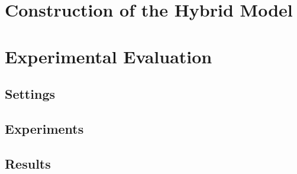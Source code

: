 \documentclass[11pt,titlepage,oneside,openany]{book}
\renewcommand{\algorithmiccomment}[1]{\ensuremath{\rhd} \textit{#1}}
\def\MYCALL#1#2{{\small\textsc{#1}}(\textup{#2})}
\def\MYNOT{\textbf{ not }}
\def\MYBREAK{\textbf{break }}
\def\MYNIL{\textsc{Nil}}
\def\ONT{{\mathcal O}} %
\def\ALI{{\mathcal A}} %
\begin{document}
\chapter{Construction of the Hybrid Model}
\label{cha:alg}


\chapter{Experimental Evaluation}
\label{cha:exp}




\section{Settings}
\label{sec:setting}

\section{Experiments}
\label{sec:exp}


\section{Results}
\label{sec:results}
\end{document}
